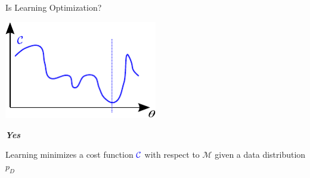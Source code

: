\documentclass[first=dgreen,second=purple,logo=yellowexc]{aaltoslides}
\newcommand{\CC}[0]{\mathcal{C}}
\newcommand{\MM}[0]{\mathcal{M}}
\begin{document}
\begin{frame}{Is Learning Optimization?}

    \centering
    \includegraphics[width=0.5\textwidth]{cost_true.pdf}

    \begin{minipage}{0.48\textwidth}
        \textbf{\emph{Yes}}
    \end{minipage}
    \hfill
    \begin{minipage}{0.48\textwidth}
    \end{minipage}


    \begin{minipage}[t]{0.48\textwidth}
        \vspace{0pt}
    Learning minimizes a cost function $\color{blue}{\CC}$ with respect to
    $\MM$ given a data distribution $p_D$

    \end{minipage}
    \hfill
    \begin{minipage}[t]{0.48\textwidth}

    \end{minipage}

\end{frame}
\end{document}
